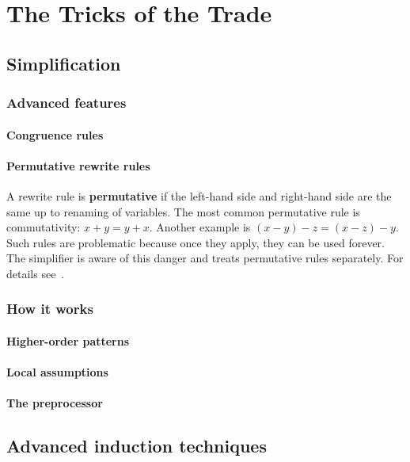 \chapter{The Tricks of the Trade}

\section{Simplification}
\label{sec:simplification-II}

\subsection{Advanced features}

\subsubsection{Congruence rules}


\subsubsection{Permutative rewrite rules}

A rewrite rule is \textbf{permutative} if the left-hand side and right-hand
side are the same up to renaming of variables.  The most common permutative
rule is commutativity: $x+y = y+x$.  Another example is $(x-y)-z = (x-z)-y$.
Such rules are problematic because once they apply, they can be used forever.
The simplifier is aware of this danger and treats permutative rules
separately. For details see~\cite{isabelle-ref}.



\subsection{How it works}
\label{sec:SimpHow}

\subsubsection{Higher-order patterns}

\subsubsection{Local assumptions}

\subsubsection{The preprocessor}



\section{Advanced induction techniques}
\label{sec:advanced-ind}

